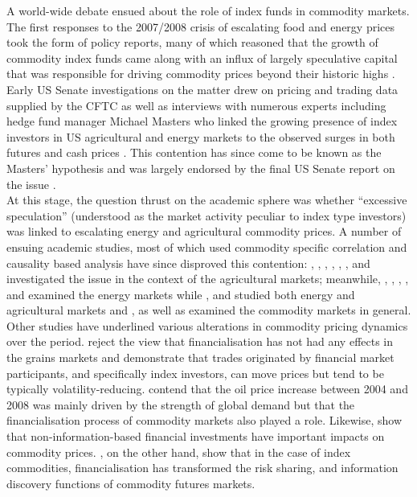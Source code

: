 \documentclass[
  authoryear,
  preprint,
  3p]{elsarticle}
\begin{document}
A world-wide debate ensued about the role of index funds in commodity
markets. The first responses to the 2007/2008 crisis of escalating food
and energy prices took the form of policy reports, many of which
reasoned that the growth of commodity index funds came along with an
influx of largely speculative capital that was responsible for driving
commodity prices beyond their historic highs
\citep{deschutter_food_2010, gilbert_speculative_2010, herman_not_2011, schumann_hunger_2011, unctad_global_2009}.\\
Early US Senate investigations on the matter drew on pricing and trading
data supplied by the CFTC as well as interviews with numerous experts
including hedge fund manager Michael Masters who linked the growing
presence of index investors in US agricultural and energy markets to the
observed surges in both futures and cash prices
\citep{masters_testimony_2008, masters_accidental_2008}. This contention
has since come to be known as the Masters' hypothesis and was largely
endorsed by the final US Senate report on the issue
\citep{senate_excessive_2009}.\\
At this stage, the question thrust on the academic sphere was whether
``excessive speculation'' (understood as the market activity peculiar to
index type investors) was linked to escalating energy and agricultural
commodity prices. A number of ensuing academic studies, most of which
used commodity specific correlation and causality based analysis have
since disproved this contention: \citet{irwin_devil_2009},
\citet{sanders_adequacy_2010}, \citet{sanders_impact_2011},
\citet{sanders_new_2011}, \citet{irwin_commodity_2013},
\citet{brunetti_commodity_2014}, \citet{hamilton_effects_2015} and
\citet{bruno_financialisation_2017} investigated the issue in the
context of the agricultural markets; meanwhile,
\citet{buyuksahin_speculators_2011}, \citet{tokic_speculation_2012},
\citet{fattouh_role_2013}, \citet{kilian_role_2014},
\citet{knittel_simple_2016} and \citet{manera_modelling_2016} examined
the energy markets while \citet{bohl_does_2013}, \citet{kim_does_2015}
and \citet{boyd_prevalence_2016} studied both energy and agricultural
markets and \citet{irwin_index_2011},
\citet{irwin_financialisation_2012} as well as
\citet{stoll_commodity_2011} examined the commodity markets in general.
Other studies have underlined various alterations in commodity pricing
dynamics over the period. \citet{gilbert_role_2014} reject the view that
financialisation has not had any effects in the grains markets and
demonstrate that trades originated by financial market participants, and
specifically index investors, can move prices but tend to be typically
volatility-reducing. \citet{juvenal_speculation_2015} contend that the
oil price increase between 2004 and 2008 was mainly driven by the
strength of global demand but that the financialisation process of
commodity markets also played a role. Likewise,
\citet{henderson_new_2015} show that non-information-based financial
investments have important impacts on commodity prices.
\citet{cheng_financialisation_2014}, on the other hand, show that in the
case of index commodities, financialisation has transformed the risk
sharing, and information discovery functions of commodity futures
markets.
\end{document}
